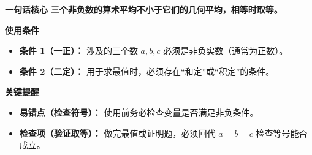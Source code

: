 \begin{summarybox}
\textbf{\textcolor{CSummary}{一句话核心}}
\textbf{三个非负数的算术平均不小于它们的几何平均，相等时取等。}

\medskip
\textbf{\textcolor{CSummary}{使用条件}}
\begin{itemize}[leftmargin=*, itemsep=0.5em, topsep=0.4em]
    \item \textbf{条件 1（一正）：} 涉及的三个数 $a, b, c$ 必须是非负实数（通常为正数）。
    \item \textbf{条件 2（二定）：} 用于求最值时，必须存在“和定”或“积定”的条件。
\end{itemize}

\medskip
\textbf{\textcolor{CSummary}{关键提醒}}
\begin{itemize}[leftmargin=*, itemsep=0.5em, topsep=0.4em]
    \item \textbf{易错点（检查符号）：} 使用前务必检查变量是否满足非负条件。
    \item \textbf{检查项（验证取等）：} 做完最值或证明题，必须回代 $a=b=c$ 检查等号能否成立。
\end{itemize}
\end{summarybox}
